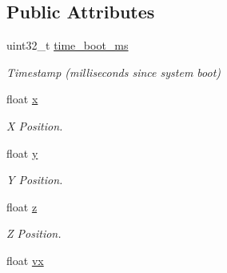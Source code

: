 \subsection*{Public Attributes}
\begin{DoxyCompactItemize}
\item 
\hypertarget{struct____mavlink__local__position__ned__t_a00187442905b1327719d9fde885a9bf9}{uint32\+\_\+t \hyperlink{struct____mavlink__local__position__ned__t_a00187442905b1327719d9fde885a9bf9}{time\+\_\+boot\+\_\+ms}}\label{struct____mavlink__local__position__ned__t_a00187442905b1327719d9fde885a9bf9}

\begin{DoxyCompactList}\small\item\em Timestamp (milliseconds since system boot) \end{DoxyCompactList}\item 
\hypertarget{struct____mavlink__local__position__ned__t_ab8f239110cba8ccc0f92aab56bc9a1d3}{float \hyperlink{struct____mavlink__local__position__ned__t_ab8f239110cba8ccc0f92aab56bc9a1d3}{x}}\label{struct____mavlink__local__position__ned__t_ab8f239110cba8ccc0f92aab56bc9a1d3}

\begin{DoxyCompactList}\small\item\em X Position. \end{DoxyCompactList}\item 
\hypertarget{struct____mavlink__local__position__ned__t_a56754cbe34638a9f6b5adca9ecf7fb44}{float \hyperlink{struct____mavlink__local__position__ned__t_a56754cbe34638a9f6b5adca9ecf7fb44}{y}}\label{struct____mavlink__local__position__ned__t_a56754cbe34638a9f6b5adca9ecf7fb44}

\begin{DoxyCompactList}\small\item\em Y Position. \end{DoxyCompactList}\item 
\hypertarget{struct____mavlink__local__position__ned__t_a4fc3fd6b6974b6b2356e4a7e28f9fecd}{float \hyperlink{struct____mavlink__local__position__ned__t_a4fc3fd6b6974b6b2356e4a7e28f9fecd}{z}}\label{struct____mavlink__local__position__ned__t_a4fc3fd6b6974b6b2356e4a7e28f9fecd}

\begin{DoxyCompactList}\small\item\em Z Position. \end{DoxyCompactList}\item 
\hypertarget{struct____mavlink__local__position__ned__t_a87216fec6527221da8812d77d8d84eb1}{float \hyperlink{struct____mavlink__local__position__ned__t_a87216fec6527221da8812d77d8d84eb1}{vx}}\label{struct____mavlink__local__position__ned__t_a87216fec6527221da8812d77d8d84eb1}


\end{DoxyCompactItemize}
